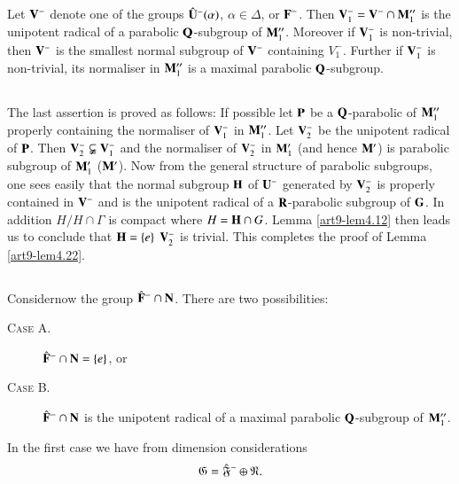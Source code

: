 \begin{lemma}\label{art9-lem4.22}
Let $\mathbf{V}^-$ denote one of the groups $\hat{\mathbf{U}}^-(\alpha)$, $\alpha \in \Delta$, or $\mathbf{F}^-$. Then $\mathbf{V}^-_1 = \mathbf{V}^- \cap \mathbf{M}''_1$ is the unipotent radical of a parabolic $\mathbf{Q}$-subgroup of $\mathbf{M}''_1$. Moreover if $\mathbf{V}^-_1$ is non-trivial, then $\mathbf{V}^-$ is the smallest normal subgroup of $\mathbf{V}^-$ containing $V^-_1$. Further if $\mathbf{V}^-_1$ is non-trivial, its normaliser in $\mathbf{M}''_1$ is a maximal parabolic $\mathbf{Q}$-subgroup.
\end{lemma}


\subsection{}\label{art9-subsec4.23}
The last assertion is proved as follows: If possible let $\mathbf{P}$ be a $\mathbf{Q}$-parabolic of $\mathbf{M}''_1$ properly containing the normaliser of $\mathbf{V}^-_1$ in $\mathbf{M}''_1$. Let $\mathbf{V}^-_2$ be the unipotent radical of $\mathbf{P}$. Then $\mathbf{V}^-_2 \varsubsetneqq \mathbf{V}^-_1$ and the normaliser of $\mathbf{V}^-_2$ in $\mathbf{M}'_1$  (and hence $\mathbf{M}'$) is parabolic subgroup of $\mathbf{M}'_1$ (\resp $\mathbf{M}'$). Now from the general structure of parabolic subgroups, one sees easily that the normal subgroup $\mathbf{H}$ of $\mathbf{U}^-$ generated by $\mathbf{V}^-_2$ is properly contained in $\mathbf{V}^-$ and is the unipotent radical of a $\mathbf{R}$-parabolic subgroup of $\mathbf{G}$. In addition $H/H \cap \Gamma$ is compact where $H = \mathbf{H} \cap G$. Lemma \ref{art9-lem4.12} then leads us to conclude that $\mathbf{H} = \{e\}$ \ie $\mathbf{V}^-_2$ is trivial. This completes the proof of Lemma \ref{art9-lem4.22}.

\subsection{}\label{art9-subsec4.24}
Consider\pageoriginale now the group $\hat{\mathbf{F}}^- \cap \mathbf{N}$. There are two possibilities: 
\begin{description}
\item[\textsc{Case A.}] $\hat{\mathbf{F}}^- \cap \mathbf{N} = \{e\}$, or 

\item[\textsc{Case B.}] $\hat{\mathbf{F}}^- \cap \mathbf{N}$ is the unipotent radical of a maximal parabolic $\mathbf{Q}$-subgroup of $\mathbf{M}''_1$.
\end{description}

In the first case we have from dimension considerations
$$
\mathfrak{G} = \hat{\mathfrak{F}}^- \oplus \mathfrak{N}.
$$

